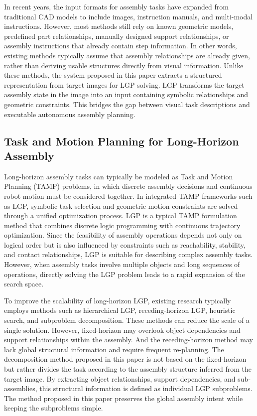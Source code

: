 \documentclass[journal]{IEEEtran}
\begin{document}
In recent years, the input formats for assembly tasks have expanded from traditional CAD models to include images, instruction manuals, and multi-modal instructions.
However, most methods still rely on known geometric models, predefined part relationships, manually designed support relationships, or assembly instructions that already contain step information.
In other words, existing methods typically assume that assembly relationships are already given, rather than deriving usable structures directly from visual information.
Unlike these methods, the system proposed in this paper extracts a structured representation from target images for LGP solving.
LGP transforms the target assembly state in the image into an input containing symbolic relationships and geometric constraints.
This bridges the gap between visual task descriptions and executable autonomous assembly planning.

\subsection{Task and Motion Planning for Long-Horizon Assembly}
Long-horizon assembly tasks can typically be modeled as Task and Motion Planning (TAMP) problems, in which discrete assembly decisions and continuous robot motion must be considered together.
In integrated TAMP frameworks such as LGP, symbolic task selection and geometric motion constraints are solved through a unified optimization process.
LGP is a typical TAMP formulation method that combines discrete logic programming with continuous trajectory optimization.
Since the feasibility of assembly operations depends not only on logical order but is also influenced by constraints such as reachability, stability, and contact relationships, LGP is suitable for describing complex assembly tasks.
However, when assembly tasks involve multiple objects and long sequences of operations, directly solving the LGP problem leads to a rapid expansion of the search space.

To improve the scalability of long-horizon LGP, existing research typically employs methods such as hierarchical LGP, receding-horizon LGP, heuristic search, and subproblem decomposition.
These methods can reduce the scale of a single solution.
However, fixed-horizon may overlook object dependencies and support relationships within the assembly.
And the receding-horizon method may lack global structural information and require frequent re-planning.
The decomposition method proposed in this paper is not based on the fixed-horizon but rather divides the task according to the assembly structure inferred from the target image.
By extracting object relationships, support dependencies, and sub-assemblies, this structural information is defined as individual LGP subproblems.
The method proposed in this paper preserves the global assembly intent while keeping the subproblems simple.
\end{document}
